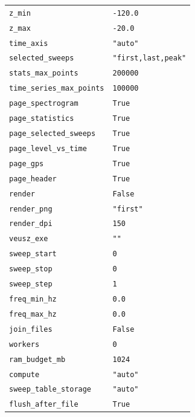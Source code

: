 \documentclass[11pt,a4paper]{article}
\begin{document}
\begin{longtable}{p{5.6cm}p{9.6cm}}
\texttt{z\_\allowbreak{}min} & \texttt{-120.0}\\
\texttt{z\_\allowbreak{}max} & \texttt{-20.0}\\
\texttt{time\_\allowbreak{}axis} & \texttt{"auto"}\\
\texttt{selected\_\allowbreak{}sweeps} & \texttt{"first,last,peak"}\\
\texttt{stats\_\allowbreak{}max\_\allowbreak{}points} & \texttt{200000}\\
\texttt{time\_\allowbreak{}series\_\allowbreak{}max\_\allowbreak{}points} & \texttt{100000}\\
\texttt{page\_\allowbreak{}spectrogram} & \texttt{True}\\
\texttt{page\_\allowbreak{}statistics} & \texttt{True}\\
\texttt{page\_\allowbreak{}selected\_\allowbreak{}sweeps} & \texttt{True}\\
\texttt{page\_\allowbreak{}level\_\allowbreak{}vs\_\allowbreak{}time} & \texttt{True}\\
\texttt{page\_\allowbreak{}gps} & \texttt{True}\\
\texttt{page\_\allowbreak{}header} & \texttt{True}\\
\texttt{render} & \texttt{False}\\
\texttt{render\_\allowbreak{}png} & \texttt{"first"}\\
\texttt{render\_\allowbreak{}dpi} & \texttt{150}\\
\texttt{veusz\_\allowbreak{}exe} & \texttt{""}\\
\texttt{sweep\_\allowbreak{}start} & \texttt{0}\\
\texttt{sweep\_\allowbreak{}stop} & \texttt{0}\\
\texttt{sweep\_\allowbreak{}step} & \texttt{1}\\
\texttt{freq\_\allowbreak{}min\_\allowbreak{}hz} & \texttt{0.0}\\
\texttt{freq\_\allowbreak{}max\_\allowbreak{}hz} & \texttt{0.0}\\
\texttt{join\_\allowbreak{}files} & \texttt{False}\\
\texttt{workers} & \texttt{0}\\
\texttt{ram\_\allowbreak{}budget\_\allowbreak{}mb} & \texttt{1024}\\
\texttt{compute} & \texttt{"auto"}\\
\texttt{sweep\_\allowbreak{}table\_\allowbreak{}storage} & \texttt{"auto"}\\
\texttt{flush\_\allowbreak{}after\_\allowbreak{}file} & \texttt{True}\\
\bottomrule
\end{longtable}
\end{document}
